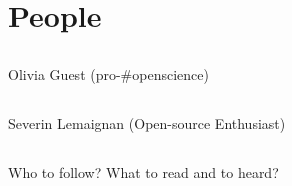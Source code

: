 \section{People}



\subsection{}
{

\begin{frame}{Olivia Guest (pro-\#openscience)}
    \begin{figure}
	
   \end{figure}
	
\end{frame}
}




\subsection{}
{


\begin{frame}{Severin Lemaignan (Open-source Enthusiast) } 
    \begin{figure}
	
   \end{figure}
	
\end{frame}
}






\subsection{}
{

\begin{frame}{Who to follow? What to read and to heard? } 
    \begin{figure}
	
   \end{figure}
	
\end{frame}
}




